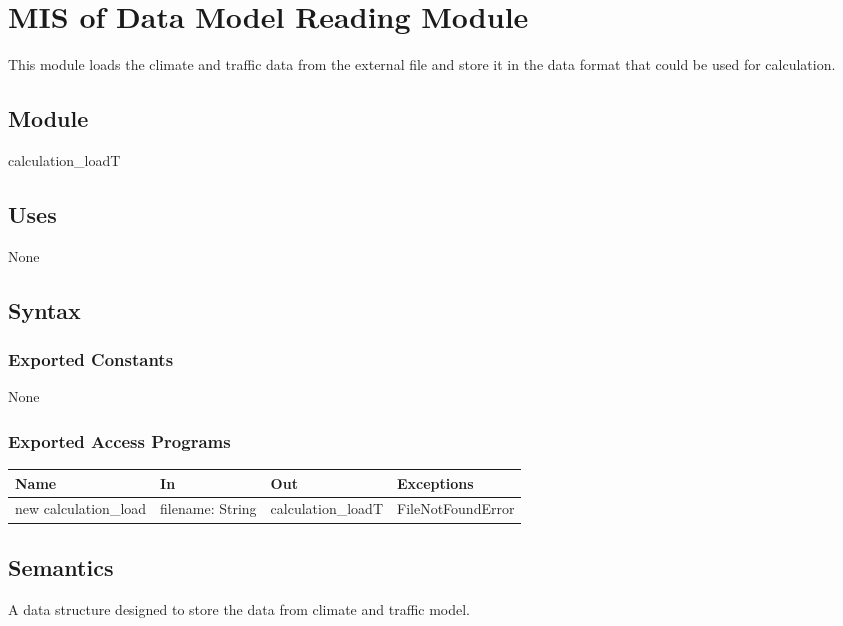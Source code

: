 \documentclass[12pt, titlepage]{article}
\begin{document}
\section{MIS of Data Model Reading Module} \label{dataModelReadingModule}
This module loads the climate and traffic data from the external file and store it in the data format that could be used for calculation.

\subsection{Module}
calculation\_loadT

\subsection{Uses}

None


\subsection{Syntax}

\subsubsection{Exported Constants}
None
\subsubsection{Exported Access Programs}

\begin{center}
\begin{tabular}{p{4cm} p{3cm} p{4cm} p{4cm}}
\hline
\textbf{Name} & \textbf{In} & \textbf{Out} & \textbf{Exceptions} \\
\hline
new calculation\_load & filename: String & calculation\_loadT & FileNotFoundError \\
\hline
\end{tabular}
\end{center}

\subsection{Semantics}
A data structure designed to store the data from climate and traffic model.
\end{document}
